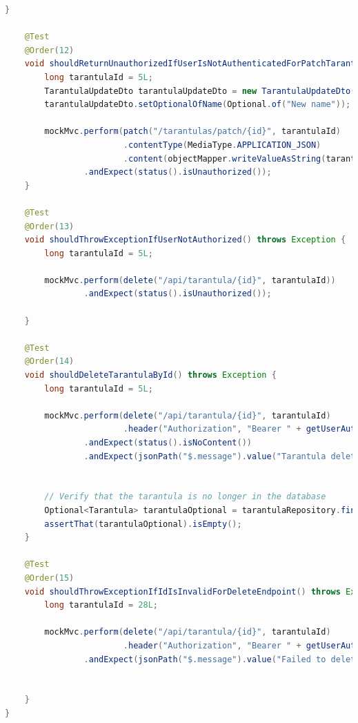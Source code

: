 \documentclass[a4paper,12pt,oneside]{article}
\begin{document}
\begin{lstlisting}[language=Java]
    }

    @Test
    @Order(12)
    void shouldReturnUnauthorizedIfUserIsNotAuthenticatedForPatchTarantula() throws Exception {
        long tarantulaId = 5L;
        TarantulaUpdateDto tarantulaUpdateDto = new TarantulaUpdateDto();
        tarantulaUpdateDto.setOptionalOfName(Optional.of("New name"));

        mockMvc.perform(patch("/tarantulas/patch/{id}", tarantulaId)
                        .contentType(MediaType.APPLICATION_JSON)
                        .content(objectMapper.writeValueAsString(tarantulaUpdateDto)))
                .andExpect(status().isUnauthorized());
    }

    @Test
    @Order(13)
    void shouldThrowExceptionIfUserNotAuthorized() throws Exception {
        long tarantulaId = 5L;

        mockMvc.perform(delete("/api/tarantula/{id}", tarantulaId))
                .andExpect(status().isUnauthorized());

    }

    @Test
    @Order(14)
    void shouldDeleteTarantulaById() throws Exception {
        long tarantulaId = 5L;

        mockMvc.perform(delete("/api/tarantula/{id}", tarantulaId)
                        .header("Authorization", "Bearer " + getUserAuthToken()))
                .andExpect(status().isNoContent())
                .andExpect(jsonPath("$.message").value("Tarantula deleted successfully."));


        // Verify that the tarantula is no longer in the database
        Optional<Tarantula> tarantulaOptional = tarantulaRepository.findById(tarantulaId);
        assertThat(tarantulaOptional).isEmpty();
    }

    @Test
    @Order(15)
    void shouldThrowExceptionIfIdIsInvalidForDeleteEndpoint() throws Exception {
        long tarantulaId = 28L;

        mockMvc.perform(delete("/api/tarantula/{id}", tarantulaId)
                        .header("Authorization", "Bearer " + getUserAuthToken()))
                .andExpect(jsonPath("$.message").value("Failed to delete tarantula."));


    }
}
\end{lstlisting}

\newpage
\end{document}
